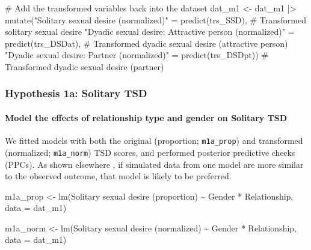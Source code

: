 \documentclass[
  bookmarksnumbered]{article}
\newenvironment{Shaded}{\begin{snugshade}}{\end{snugshade}}
\newcommand{\AttributeTok}[1]{\textcolor[rgb]{0.80,0.80,0.80}{#1}}
\newcommand{\CommentTok}[1]{\textcolor[rgb]{0.50,0.62,0.50}{#1}}
\newcommand{\FunctionTok}[1]{\textcolor[rgb]{0.94,0.94,0.56}{#1}}
\newcommand{\NormalTok}[1]{\textcolor[rgb]{0.80,0.80,0.80}{#1}}
\newcommand{\OtherTok}[1]{\textcolor[rgb]{0.94,0.94,0.56}{#1}}
\newcommand{\SpecialCharTok}[1]{\textcolor[rgb]{0.86,0.64,0.64}{#1}}
\newcommand{\StringTok}[1]{\textcolor[rgb]{0.80,0.58,0.58}{#1}}
\begin{document}
\begin{Shaded}
\begin{Highlighting}[]
\CommentTok{\# Add the transformed variables back into the dataset  }
\NormalTok{dat\_m1 }\OtherTok{\textless{}{-}}\NormalTok{ dat\_m1 }\SpecialCharTok{|\textgreater{}}  
  \FunctionTok{mutate}\NormalTok{(}\StringTok{"Solitary sexual desire (normalized)"} \OtherTok{=} 
           \FunctionTok{predict}\NormalTok{(trs\_SSD),  }\CommentTok{\# Transformed solitary sexual desire  }
         \StringTok{"Dyadic sexual desire: Attractive person (normalized)"} \OtherTok{=} 
           \FunctionTok{predict}\NormalTok{(trs\_DSDat),  }\CommentTok{\# Transformed dyadic sexual desire (attractive person)  }
         \StringTok{"Dyadic sexual desire: Partner (normalized)"} \OtherTok{=} 
           \FunctionTok{predict}\NormalTok{(trs\_DSDpt))  }\CommentTok{\# Transformed dyadic sexual desire (partner)  }
\end{Highlighting}
\end{Shaded}

\subsubsection{Hypothesis 1a: Solitary TSD}\label{hypothesis1a}

\paragraph{Model the effects of relationship type and gender on Solitary TSD}\label{model-the-effects-of-relationship-type-and-gender-on-solitary-tsd}

We fitted models with both the original (proportion; \texttt{m1a\_prop}) and transformed (normalized; \texttt{m1a\_norm}) TSD scores, and performed posterior predictive checks (PPCs). As shown elsewhere \autocite[e.g.,][]{gabryVisualizationBayesianWorkflow2019}, if simulated data from one model are more similar to the observed outcome, that model is likely to be preferred.

\begin{Shaded}
\begin{Highlighting}[]
\NormalTok{m1a\_prop }\OtherTok{\textless{}{-}} \FunctionTok{lm}\NormalTok{(}\StringTok{\textasciigrave{}}\AttributeTok{Solitary sexual desire (proportion)}\StringTok{\textasciigrave{}} \SpecialCharTok{\textasciitilde{}}\NormalTok{ Gender }\SpecialCharTok{*}\NormalTok{ Relationship,}
            \AttributeTok{data =}\NormalTok{ dat\_m1)}

\NormalTok{m1a\_norm }\OtherTok{\textless{}{-}} \FunctionTok{lm}\NormalTok{(}\StringTok{\textasciigrave{}}\AttributeTok{Solitary sexual desire (normalized)}\StringTok{\textasciigrave{}} \SpecialCharTok{\textasciitilde{}}\NormalTok{ Gender }\SpecialCharTok{*}\NormalTok{ Relationship,}
           \AttributeTok{data =}\NormalTok{ dat\_m1)}
\end{Highlighting}
\end{Shaded}
\end{document}
